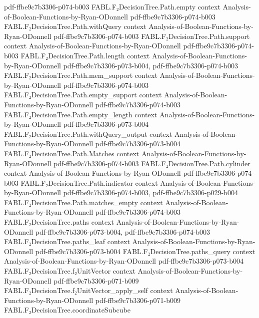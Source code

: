 \begin{theorem}
  {pdf-ffbe9c7b3306-p074-b003}
\proofstep
  {FABL.F₂DecisionTree.Path.empty}
  {context}
  {Analysis-of-Boolean-Functions-by-Ryan-ODonnell}
  {pdf-ffbe9c7b3306-p074-b003}
\proofstep
  {FABL.F₂DecisionTree.Path.withQuery}
  {context}
  {Analysis-of-Boolean-Functions-by-Ryan-ODonnell}
  {pdf-ffbe9c7b3306-p074-b003}
\proofstep
  {FABL.F₂DecisionTree.Path.support}
  {context}
  {Analysis-of-Boolean-Functions-by-Ryan-ODonnell}
  {pdf-ffbe9c7b3306-p074-b003}
\proofstep
  {FABL.F₂DecisionTree.Path.length}
  {context}
  {Analysis-of-Boolean-Functions-by-Ryan-ODonnell}
  {pdf-ffbe9c7b3306-p073-b004,
    pdf-ffbe9c7b3306-p074-b003}
\proofstep
  {FABL.F₂DecisionTree.Path.mem_support}
  {context}
  {Analysis-of-Boolean-Functions-by-Ryan-ODonnell}
  {pdf-ffbe9c7b3306-p074-b003}
\proofstep
  {FABL.F₂DecisionTree.Path.empty_support}
  {context}
  {Analysis-of-Boolean-Functions-by-Ryan-ODonnell}
  {pdf-ffbe9c7b3306-p074-b003}
\proofstep
  {FABL.F₂DecisionTree.Path.empty_length}
  {context}
  {Analysis-of-Boolean-Functions-by-Ryan-ODonnell}
  {pdf-ffbe9c7b3306-p073-b004}
\proofstep
  {FABL.F₂DecisionTree.Path.withQuery_output}
  {context}
  {Analysis-of-Boolean-Functions-by-Ryan-ODonnell}
  {pdf-ffbe9c7b3306-p073-b004}
\proofstep
  {FABL.F₂DecisionTree.Path.Matches}
  {context}
  {Analysis-of-Boolean-Functions-by-Ryan-ODonnell}
  {pdf-ffbe9c7b3306-p074-b003}
\proofstep
  {FABL.F₂DecisionTree.Path.cylinder}
  {context}
  {Analysis-of-Boolean-Functions-by-Ryan-ODonnell}
  {pdf-ffbe9c7b3306-p074-b003}
\proofstep
  {FABL.F₂DecisionTree.Path.indicator}
  {context}
  {Analysis-of-Boolean-Functions-by-Ryan-ODonnell}
  {pdf-ffbe9c7b3306-p074-b003,
    pdf-ffbe9c7b3306-p029-b004}
\proofstep
  {FABL.F₂DecisionTree.Path.matches_empty}
  {context}
  {Analysis-of-Boolean-Functions-by-Ryan-ODonnell}
  {pdf-ffbe9c7b3306-p074-b003}
\proofstep
  {FABL.F₂DecisionTree.paths}
  {context}
  {Analysis-of-Boolean-Functions-by-Ryan-ODonnell}
  {pdf-ffbe9c7b3306-p073-b004,
    pdf-ffbe9c7b3306-p074-b003}
\proofstep
  {FABL.F₂DecisionTree.paths_leaf}
  {context}
  {Analysis-of-Boolean-Functions-by-Ryan-ODonnell}
  {pdf-ffbe9c7b3306-p073-b004}
\proofstep
  {FABL.F₂DecisionTree.paths_query}
  {context}
  {Analysis-of-Boolean-Functions-by-Ryan-ODonnell}
  {pdf-ffbe9c7b3306-p073-b004}
\proofstep
  {FABL.F₂DecisionTree.f₂UnitVector}
  {context}
  {Analysis-of-Boolean-Functions-by-Ryan-ODonnell}
  {pdf-ffbe9c7b3306-p071-b009}
\proofstep
  {FABL.F₂DecisionTree.f₂UnitVector_apply_self}
  {context}
  {Analysis-of-Boolean-Functions-by-Ryan-ODonnell}
  {pdf-ffbe9c7b3306-p071-b009}
\proofstep
  {FABL.F₂DecisionTree.coordinateSubcube}

\end{theorem}
